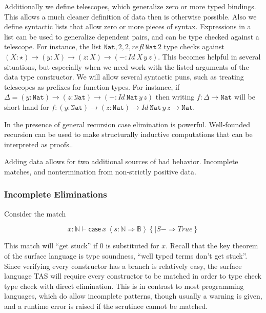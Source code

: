 Additionally we define telescopes, which generalize zero or more typed
bindings. This allows a much
cleaner definition of data then is otherwise possible. Also we define
syntactic lists that allow zero or more pieces of syntax. Expressions
in a list can be used to generalize dependent pairs, and can be type
checked against a telescope. For instance, the list $\mathtt{Nat},2,2,refl\,\mathtt{Nat}\,2$
type checks against $\left(X:\star\right)\rightarrow\left(y:X\right)\rightarrow\left(z:X\right)\rightarrow\left(-:Id\ X\,y\,z\right)$.
This becomes helpful in several situations, but especially when we
need work with the listed arguments of the data type constructor.
We will allow several syntactic puns, such as treating telescopes
as prefixes for function types. For instance, if $\Delta=\left(y:\mathtt{Nat}\right)\rightarrow\left(z:\mathtt{Nat}\right)\rightarrow\left(-:Id\ \mathtt{Nat}\,y\,z\right)$
then writing $f:\Delta\rightarrow\mathtt{Nat}$ will be short hand
for $f:\left(y:\mathtt{Nat}\right)\rightarrow\left(z:\mathtt{Nat}\right)\rightarrow Id\ \mathtt{Nat}\,y\,z\rightarrow\mathtt{Nat}$.

In the presence of general recursion case elimination is powerful.
Well-founded recursion can be used to make structurally inductive
computations that can be interpreted as proofs..

Adding data allows for two additional sources of bad behavior. Incomplete
matches, and nontermination from non-strictly positive data. 

\subsubsection{Incomplete Eliminations}

Consider the match 

\[
x:\mathbb{N}\vdash\mathsf{case}\,x\,\left\langle s:\mathbb{N}\Rightarrow\mathbb{B}\right\rangle \left\{ |S-\Rightarrow True\right\} 
\]

This match will ``get stuck'' if $0$ is substituted for $x$. Recall
that the key theorem of the surface language is type soundness, ``well
typed terms don't get stuck''. Since verifying every constructor
has a branch is relatively easy, the surface language TAS will require
every constructor to be matched in order to type check type check
with direct elimination. This is in contrast to most programming languages,
which do allow incomplete patterns, though usually a warning is given,
and a runtime error is raised if the scrutinee cannot be matched.

